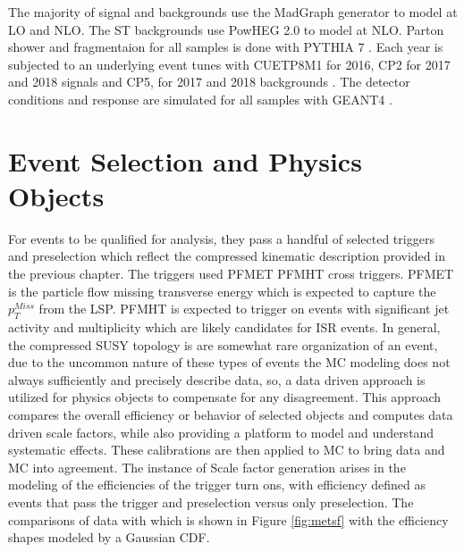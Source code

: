 
The majority of signal and backgrounds use the MadGraph \cite{madgraph} generator to model at LO and NLO. The ST backgrounds use PowHEG 2.0 \cite{powheg} to model at NLO. Parton shower and fragmentaion for all samples is done with PYTHIA 7 \cite{pythia}. Each year is subjected to an underlying event tunes with CUETP8M1 for 2016, CP2 for 2017 and 2018 signals and CP5, for 2017 and 2018 backgrounds \cite{erich tunes}. The detector conditions and response are simulated for all samples with GEANT4 \cite{geant}.
 
\section{Event Selection and Physics Objects}
 For events to be qualified for analysis, they pass a handful of selected triggers and preselection which reflect the compressed kinematic description provided in the previous chapter. The triggers used PFMET PFMHT cross triggers. PFMET is the particle flow missing transverse energy which is expected to capture the $p_T^{Miss}$ from the LSP. PFMHT is expected to trigger on events with significant jet activity and multiplicity which are likely candidates for ISR events.  In general, the compressed SUSY topology is are somewhat rare organization of an event, due to the uncommon nature of these types of events the MC modeling does not always sufficiently and precisely describe data, so,  a data driven approach is utilized for physics objects to compensate for any disagreement. This approach compares the overall efficiency or behavior of selected objects and computes data driven scale factors, while also providing a platform to model and understand systematic effects. These calibrations are then applied to MC to bring data and MC into agreement. The instance of Scale factor generation arises in the modeling of the efficiencies of the trigger turn ons, with efficiency defined as events that pass the trigger and preselection versus only preselection. The comparisons of data with  which is shown in Figure \ref{fig:metsf} with the efficiency shapes modeled by a Gaussian CDF.  


